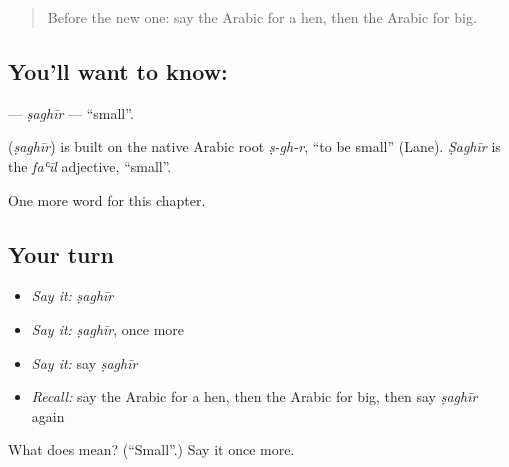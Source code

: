 \label{lesson:AR-C81-saghir}



\begin{quote}
Before the new one: say the Arabic for a hen, then the Arabic for big.
\end{quote}

\subsection*{You'll want to know: }
\textbf{} — \emph{ṣaghīr} — \textquotedblleft{}small\textquotedblright{}.

\begin{cousinweb}
\textbf{} (\emph{ṣaghīr}) is built on the native Arabic root \emph{ṣ-gh-r}, \textquotedblleft{}to be small\textquotedblright{} (Lane). \emph{Ṣaghīr} is the \emph{faʿīl} adjective, \textquotedblleft{}small\textquotedblright{}.
\end{cousinweb}

\begin{grammarlens}[title={What you've built}]
One more word for this chapter.
\end{grammarlens}

\subsection*{Your turn}
\begin{itemize}
\raggedright
  \item \emph{Say it:} \emph{ṣaghīr}
  \item \emph{Say it:} \emph{ṣaghīr}, once more
  \item \emph{Say it:} say \emph{ṣaghīr}
  \item \emph{Recall:} say the Arabic for a hen, then the Arabic for big, then say \emph{ṣaghīr} again
\end{itemize}

\begin{tcolorbox}[breakable,colback=teal!4,colframe=teal!35!black,title={Before you move on}]
What does  mean? (\textquotedblleft{}Small\textquotedblright{}.) Say it once more.
\end{tcolorbox}
